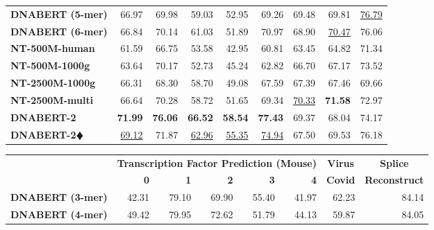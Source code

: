 \documentclass{article}
\begin{document}
\begin{table}[H]
\begin{tabular}{lrrrrrrrr}
            {\textbf{DNABERT (5-mer)} } & 66.97 & 69.98 & 59.03 & 52.95 & 69.26  &69.48 & 69.81 & \underline{76.79} \\

            {\textbf{DNABERT (6-mer) } } &  66.84 & 70.14 & 61.03 & 51.89 & 70.97 &  68.90 & \underline{70.47} & 76.06\\

            {\textbf{NT-500M-human} } & 61.59 & 66.75 & 53.58 & 42.95 & 60.81 & 63.45 & 64.82 & 71.34  \\

            {\textbf{NT-500M-1000g} } &63.64 & 70.17 & 52.73 & 45.24 & 62.82 & 66.70 & 67.17 & 73.52 \\

            {\textbf{NT-2500M-1000g} }  & 66.31 & 68.30 & 58.70 & 49.08 & 67.59 & 67.39 & 67.46 & 69.66  \\

            {\textbf{NT-2500M-multi} }  &  66.64 & 70.28 & 58.72 & 51.65 & 69.34 & \underline{70.33} & \textbf{71.58} & 72.97\\

		
		\midrule

            {\textbf{DNABERT-2} } & \textbf{71.99} & \textbf{76.06} & \textbf{66.52} & \textbf{58.54} & \textbf{77.43} & 69.37 & 68.04 & 74.17 \\

            {\textbf{DNABERT-2$\vardiamondsuit$} } &  \underline{69.12} & 71.87 & \underline{62.96} & \underline{55.35} & \underline{74.94} & 67.50 & 69.53 & 76.18\\
		\bottomrule
	\end{tabular}

 \begin{tabular}{lrrrrrrr}
		\toprule
  & \multicolumn{5}{c}{\textbf{Transcription Factor Prediction (Mouse)}} & \multicolumn{1}{c}{\textbf{Virus}}  & \multicolumn{1}{c}{\textbf{Splice}} \\
		\cmidrule(lr){2-6}  \cmidrule(lr){7-7}  \cmidrule(lr){8-8}
		& \textbf{ 0 } & \textbf{ 1 } & \textbf{ 2 } & \textbf{ 3 } & \textbf{4} & \textbf{Covid} & \textbf{Reconstruct} \\
		\midrule
		{\textbf{DNABERT (3-mer)} } & 42.31 & 79.10 & 69.90 & 55.40 & 41.97 & 62.23 & 84.14 \\
		
		{\textbf{DNABERT (4-mer)} } & 49.42 & 79.95 & 72.62 & 51.79 & 44.13& 59.87 & 84.05\\


\end{tabular}
\end{table}
\end{document}
